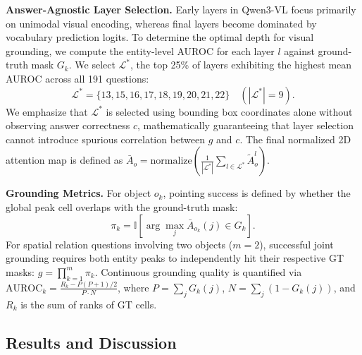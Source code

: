 \documentclass{article}
\begin{document}
\textbf{Answer-Agnostic Layer Selection.} Early layers in Qwen3-VL focus primarily on unimodal visual encoding, whereas final layers become dominated by vocabulary prediction logits. To determine the optimal depth for visual grounding, we compute the entity-level AUROC for each layer $l$ against ground-truth mask $G_k$. We select $\mathcal{L}^*$, the top 25\% of layers exhibiting the highest mean AUROC across all 191 questions:
\begin{equation}
    \mathcal{L}^* = \{13, 15, 16, 17, 18, 19, 20, 21, 22\} \quad (|\mathcal{L}^*| = 9).
\end{equation}
We emphasize that $\mathcal{L}^*$ is selected using bounding box coordinates alone without observing answer correctness $c$, mathematically guaranteeing that layer selection cannot introduce spurious correlation between $g$ and $c$. The final normalized 2D attention map is defined as $\bar{A}_o = \text{normalize}\left(\frac{1}{|\mathcal{L}^*|} \sum_{l \in \mathcal{L}^*} \tilde{A}^l_o\right)$.

\textbf{Grounding Metrics.} For object $o_k$, pointing success is defined by whether the global peak cell overlaps with the ground-truth mask:
\begin{equation}
    \pi_k = \mathbb{I}\left[\arg\max_j \bar{A}_{o_k}(j) \in G_k\right].
\end{equation}
For spatial relation questions involving two objects ($m=2$), successful joint grounding requires both entity peaks to independently hit their respective GT masks: $g = \prod_{k=1}^m \pi_k$. Continuous grounding quality is quantified via $\text{AUROC}_k = \frac{R_k - P(P+1)/2}{P \cdot N}$, where $P = \sum_j G_k(j)$, $N = \sum_j (1 - G_k(j))$, and $R_k$ is the sum of ranks of GT cells.





\subsection{Results and Discussion}

\begin{table}[t]
\centering
\caption{Attention grounding vs. answer correctness on the full $V^*$ benchmark (Qwen3-VL-8B). Acc$|g$ denotes accuracy when the attention peak is on ($g{=}1$) vs. off ($g{=}0$) the ground-truth object.}
\label{tab:main_results}
\end{table}
\end{document}
